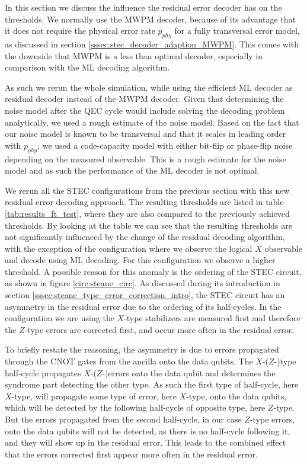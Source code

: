 In this section we discuss the influence the residual error decoder has on the thresholds. 
We normally use the MWPM decoder, because of its advantage that it does not require the physical error rate $p_{phy}$ for a fully transversal error model, 
as discussed in section \ref{sssec:stec_decoder_adaption_MWPM}. 
This comes with the downside that MWPM is a less than optimal decoder, especially in comparison with the ML decoding algorithm. 

As such we rerun the whole simulation, while using the efficient ML decoder as residual decoder instead of the MWPM decoder.
Given that determining the noise model after the QEC cycle would include solving the decoding problem analytically, we used a rough estimate of the noise model.
Based on the fact that our noise model is known to be transversal and that it scales in leading order with $p_{phy}$, 
we used a code-capacity model with either bit-flip or phase-flip noise depending on the measured observable.
This is a rough estimate for the noise model and as such the performance of the ML decoder is not optimal.

We rerun all the STEC configurations from the previous section with this new residual error decoding approach.
The resulting thresholds are listed in table \ref{tab:results_ft_test}, where they are also compared to the previously achieved thresholds.
By looking at the table we can see that the resulting thresholds are not significantly influenced by the change of the residual decoding algorithm, 
with the exception of the configuration where we observe the logical $X$ observable and decode using ML decoding. 
For this configuration we observe a higher threshold. 
A possible reason for this anomaly is the ordering of the STEC circuit, as shown in figure \ref{circ:steane_circ}.
As discussed during its introduction in section \ref{sssec:steane_type_error_correction_intro}, the STEC circuit has an asymmetry in the residual error due to the ordering of its half-cycles. 
In the configuration we are using the $X$-type stabilizers are measured first and therefore the $Z$-type errors are corrected first, and occur more often in the residual error.

To briefly restate the reasoning, the asymmetry is due to errors propagated through the CNOT gates from the ancilla onto the data qubits.
The $X$-($Z$-)type half-cycle propagates $X$-($Z$-)errors onto the data qubit and determines the syndrome part detecting the other type.
As such the first type of half-cycle, here $X$-type, will propagate some type of error, here $X$-type, onto the data qubits, 
which will be detected by the following half-cycle of opposite type, here $Z$-type.
But the errors propagated from the second half-cycle, in our case $Z$-type errors, onto the data qubits will not be detected, as there is no half-cycle following it, and they will show up in the residual error.
This leads to the combined effect that the errors corrected first appear more often in the residual error.

